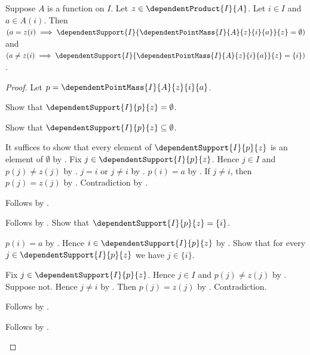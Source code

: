 \begin{proposition}\label{spike_dependent_point_mass_support}
    Suppose $A$ is a function on $I$.
    Let $z\in\dependentProduct{I}{A}$.
    Let $i\in I$ and $a\in A(i)$.
    Then
        $(a=z(i)\implies
            \dependentSupport{I}{
                \dependentPointMass{I}{A}{z}{i}{a}}{z}=\emptyset)$ and
        $(a\neq z(i)\implies
            \dependentSupport{I}{
                \dependentPointMass{I}{A}{z}{i}{a}}{z}=\{i\})$.
\end{proposition}
\begin{proof}
    Let $p=\dependentPointMass{I}{A}{z}{i}{a}$.
    \begin{byCase}
        Show that $\dependentSupport{I}{p}{z}=\emptyset$.
        \begin{subproof}
            Show that $\dependentSupport{I}{p}{z}\subseteq\emptyset$.
            \begin{subproof}
                It suffices to show that every element of
                    $\dependentSupport{I}{p}{z}$ is an element of
                    $\emptyset$ by .
                Fix $j\in\dependentSupport{I}{p}{z}$.
                Hence $j\in I$ and $p(j)\neq z(j)$ by
                    .
                $j=i$ or $j\neq i$ by \auto.
                $p(i)=a$ by
                    .
                If $j\neq i$, then $p(j)=z(j)$ by
                    .
                Contradiction by \auto.
            \end{subproof}
            Follows by .
        \end{subproof}
        Follows by \auto.
        Show that $\dependentSupport{I}{p}{z}=\{i\}$.
        \begin{subproof}
            $p(i)=a$ by
                .
            Hence $i\in\dependentSupport{I}{p}{z}$ by
                .
            Show that for every $j\in\dependentSupport{I}{p}{z}$
                we have $j\in\{i\}$.
            \begin{subproof}
                Fix $j\in\dependentSupport{I}{p}{z}$.
                Hence $j\in I$ and $p(j)\neq z(j)$ by
                    .
                Suppose not.
                Hence $j\neq i$ by .
                Then $p(j)=z(j)$ by
                    .
                Contradiction.
            \end{subproof}
            Follows by .
        \end{subproof}
        Follows by \auto.
    \end{byCase}
\end{proof}

